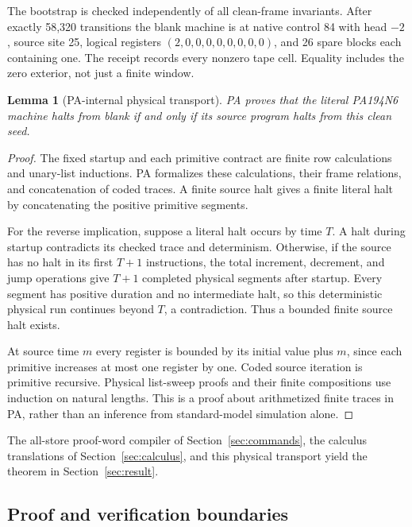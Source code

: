 \documentclass[10pt,letterpaper]{article}
\newtheorem{lemma}[theorem]{Lemma}
\begin{document}


The bootstrap is checked independently of all clean-frame invariants.
After exactly 58,320 transitions the blank machine is at native control 84
with head $-2$, source site 25, logical registers $(2,0,0,0,0,0,0,0,0)$,
and 26 spare blocks each containing one. The receipt records every nonzero
tape cell. Equality includes the zero exterior, not just a finite window.

\begin{lemma}[PA-internal physical transport]
PA proves that the literal PA194N6 machine halts from blank if and only
if its source program halts from this clean seed.
\end{lemma}
\begin{proof}
The fixed startup and each primitive contract are finite row calculations
and unary-list inductions. PA formalizes these calculations, their frame
relations, and concatenation of coded traces. A finite source halt gives
a finite literal halt by concatenating the positive primitive segments.

For the reverse implication, suppose a literal halt occurs by time $T$.
A halt during startup contradicts its checked trace and determinism.
Otherwise, if the source has no halt in its first $T+1$ instructions,
the total increment, decrement, and jump operations give $T+1$ completed
physical segments after startup. Every segment has positive duration and
no intermediate halt, so this deterministic physical run continues beyond
$T$, a contradiction. Thus a bounded finite source halt exists.

At source time $m$ every register is bounded by its initial value plus
$m$, since each primitive increases at most one register by one. Coded
source iteration is primitive recursive. Physical list-sweep proofs and
their finite compositions use induction on natural lengths. This is a
proof about arithmetized finite traces in PA, rather than an inference from
standard-model simulation alone.
\end{proof}

The all-store proof-word compiler of Section~\ref{sec:commands}, the
calculus translations of Section~\ref{sec:calculus}, and this physical
transport yield the theorem in Section~\ref{sec:result}.

\subsection{Proof and verification boundaries}
\end{document}
